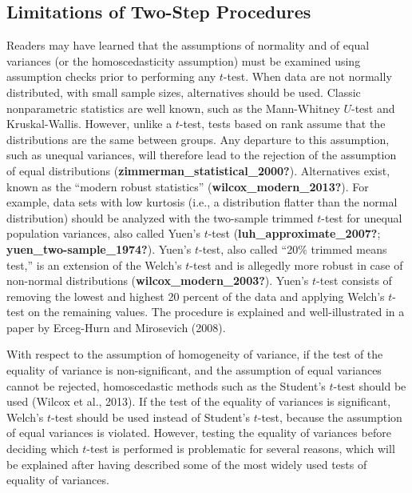 \documentclass[
  english,
  man]{apa6}
\begin{document}
\hypertarget{limitations-of-two-step-procedures}{%
\subsection{Limitations of Two-Step Procedures}\label{limitations-of-two-step-procedures}}

Readers may have learned that the assumptions of normality and of equal variances (or the homoscedasticity assumption) must be examined using assumption checks prior to performing any \(t\)-test. When data are not normally distributed, with small sample sizes, alternatives should be used. Classic nonparametric statistics are well known, such as the Mann-Whitney \(U\)-test and Kruskal-Wallis. However, unlike a \(t\)-test, tests based on rank assume that the distributions are the same between groups. Any departure to this assumption, such as unequal variances, will therefore lead to the rejection of the assumption of equal distributions (\textbf{zimmerman\_statistical\_2000?}). Alternatives exist, known as the ``modern robust statistics'' (\textbf{wilcox\_modern\_2013?}). For example, data sets with low kurtosis (i.e., a distribution flatter than the normal distribution) should be analyzed with the two-sample trimmed \(t\)-test for unequal population variances, also called Yuen's \(t\)-test (\textbf{luh\_approximate\_2007?}; \textbf{yuen\_two-sample\_1974?}). Yuen's \(t\)-test, also called ``20\(\%\) trimmed means test,'' is an extension of the Welch's \(t\)-test and is allegedly more robust in case of non-normal distributions (\textbf{wilcox\_modern\_2003?}). Yuen's \(t\)-test consists of removing the lowest and highest 20 percent of the data and applying Welch's \(t\)-test on the remaining values. The procedure is explained and well-illustrated in a paper by Erceg-Hurn and Mirosevich (2008).

With respect to the assumption of homogeneity of variance, if the test of the equality of variance is non-significant, and the assumption of equal variances cannot be rejected, homoscedastic methods such as the Student's \(t\)-test should be used (Wilcox et al., 2013). If the test of the equality of variances is significant, Welch's \(t\)-test should be used instead of Student's \(t\)-test, because the assumption of equal variances is violated. However, testing the equality of variances before deciding which \(t\)-test is performed is problematic for several reasons, which will be explained after having described some of the most widely used tests of equality of variances.
\end{document}
